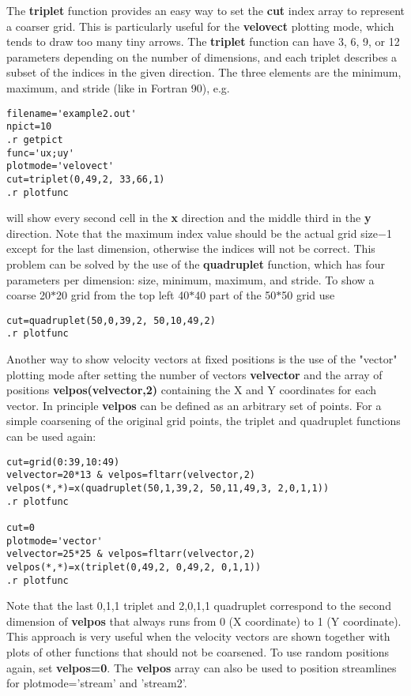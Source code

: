    The {\bf triplet} function provides an easy way to set the {\bf cut} 
   index array to represent a coarser grid. This is particularly useful
   for the {\bf velovect} plotting mode, which tends to draw too many tiny arrows.
   The {\bf triplet} function can have 3, 6, 9, or 12 parameters depending on 
   the number of dimensions, and each triplet describes a subset of the 
   indices in the given direction. The three elements are the 
   minimum, maximum, and stride (like in Fortran 90), e.g. 
\begin{verbatim}
filename='example2.out'
npict=10
.r getpict
func='ux;uy'
plotmode='velovect'
cut=triplet(0,49,2, 33,66,1)
.r plotfunc
\end{verbatim}
   will show every second cell in the {\bf x} direction and the middle third 
   in the {\bf y} direction. Note that the maximum index value should be
   the actual grid size$-$1 except for the last dimension, otherwise the 
   indices will not be correct. This problem can be solved by the use of the 
   {\bf quadruplet} function, which has four parameters per dimension:
   size, minimum, maximum, and stride. To show a coarse 20$*$20 grid 
   from the top left 40$*$40 part of the 50$*$50 grid use
\begin{verbatim}
cut=quadruplet(50,0,39,2, 50,10,49,2)
.r plotfunc
\end{verbatim}
   Another way to show velocity vectors at fixed positions is the use of 
   the "vector" plotting mode after setting the number of vectors {\bf velvector} 
   and the array of positions {\bf velpos(velvector,2)} containing the 
   X and Y coordinates for each vector. In principle {\bf velpos} can
   be defined as an arbitrary set of points.
   For a simple coarsening of the original grid points, the triplet and 
   quadruplet functions can be used again:
\begin{verbatim}
cut=grid(0:39,10:49)
velvector=20*13 & velpos=fltarr(velvector,2)
velpos(*,*)=x(quadruplet(50,1,39,2, 50,11,49,3, 2,0,1,1))
.r plotfunc

cut=0
plotmode='vector'
velvector=25*25 & velpos=fltarr(velvector,2)
velpos(*,*)=x(triplet(0,49,2, 0,49,2, 0,1,1))
.r plotfunc
\end{verbatim}
   Note that the last 0,1,1 triplet and 2,0,1,1 quadruplet correspond to
   the second dimension of {\bf velpos} that always runs from 
   0 (X coordinate) to 1 (Y coordinate). This approach is very useful when 
   the velocity vectors are shown together with plots of other functions 
   that should not be coarsened. To use random positions again, 
   set {\bf velpos=0}.
   The {\bf velpos} array can also be used to position streamlines for 
   plotmode='stream' and 'stream2'.

